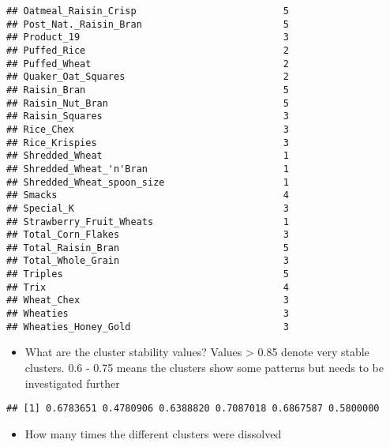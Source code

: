 \documentclass[
]{article}
\newenvironment{Shaded}{\begin{snugshade}}{\end{snugshade}}
\newcommand{\CommentTok}[1]{\textcolor[rgb]{0.56,0.35,0.01}{\textit{#1}}}
\newcommand{\NormalTok}[1]{#1}
\newcommand{\SpecialCharTok}[1]{\textcolor[rgb]{0.00,0.00,0.00}{#1}}
\providecommand{\tightlist}{%
  \setlength{\itemsep}{0pt}\setlength{\parskip}{0pt}}
\begin{document}
\begin{verbatim}
## Oatmeal_Raisin_Crisp                          5
## Post_Nat._Raisin_Bran                         5
## Product_19                                    3
## Puffed_Rice                                   2
## Puffed_Wheat                                  2
## Quaker_Oat_Squares                            2
## Raisin_Bran                                   5
## Raisin_Nut_Bran                               5
## Raisin_Squares                                3
## Rice_Chex                                     3
## Rice_Krispies                                 3
## Shredded_Wheat                                1
## Shredded_Wheat_'n'Bran                        1
## Shredded_Wheat_spoon_size                     1
## Smacks                                        4
## Special_K                                     3
## Strawberry_Fruit_Wheats                       1
## Total_Corn_Flakes                             3
## Total_Raisin_Bran                             5
## Total_Whole_Grain                             3
## Triples                                       5
## Trix                                          4
## Wheat_Chex                                    3
## Wheaties                                      3
## Wheaties_Honey_Gold                           3
\end{verbatim}

\begin{itemize}
\tightlist
\item
  What are the cluster stability values? Values \textgreater{} 0.85
  denote very stable clusters. 0.6 - 0.75 means the clusters show some
  patterns but needs to be investigated further
\end{itemize}

\begin{Shaded}
\end{Shaded}

\begin{verbatim}
## [1] 0.6783651 0.4780906 0.6388820 0.7087018 0.6867587 0.5800000
\end{verbatim}

\begin{itemize}
\tightlist
\item
  How many times the different clusters were dissolved
\end{itemize}
\end{document}
